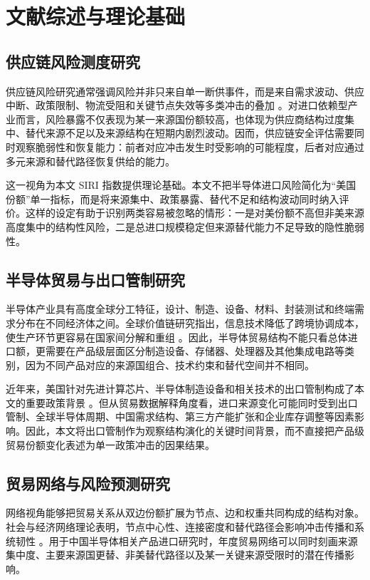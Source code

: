 \section{文献综述与理论基础}

\subsection{供应链风险测度研究}

供应链风险研究通常强调风险并非只来自单一断供事件，而是来自需求波动、供应中断、政策限制、物流受阻和关键节点失效等多类冲击的叠加 \citep{chopra2004managing,juttner2005supply}。对进口依赖型产业而言，风险暴露不仅表现为某一来源国份额较高，也体现为供应商结构过度集中、替代来源不足以及来源结构在短期内剧烈波动。因而，供应链安全评估需要同时观察脆弱性和恢复能力：前者对应冲击发生时受影响的可能程度，后者对应通过多元来源和替代路径恢复供给的能力。

这一视角为本文 SIRI 指数提供理论基础。本文不把半导体进口风险简化为“美国份额”单一指标，而是将来源集中、政策暴露、替代不足和结构波动同时纳入评价。这样的设定有助于识别两类容易被忽略的情形：一是对美份额不高但非美来源高度集中的结构性风险，二是总进口规模稳定但来源替代能力不足导致的隐性脆弱性。

\subsection{半导体贸易与出口管制研究}

半导体产业具有高度全球分工特征，设计、制造、设备、材料、封装测试和终端需求分布在不同经济体之间。全球价值链研究指出，信息技术降低了跨境协调成本，使生产环节更容易在国家间分解和重组 \citep{baldwin2016great}。因此，半导体贸易结构不能只看总体进口额，更需要在产品级层面区分制造设备、存储器、处理器及其他集成电路等类别，因为不同产品对应的来源国组合、技术约束和替代空间并不相同。

近年来，美国针对先进计算芯片、半导体制造设备和相关技术的出口管制构成了本文的重要政策背景 \citep{us_bis_controls}。但从贸易数据解释角度看，进口来源变化可能同时受到出口管制、全球半导体周期、中国需求结构、第三方产能扩张和企业库存调整等因素影响。因此，本文将出口管制作为观察结构演化的关键时间背景，而不直接把产品级贸易份额变化表述为单一政策冲击的因果结果。

\subsection{贸易网络与风险预测研究}

网络视角能够把贸易关系从双边份额扩展为节点、边和权重共同构成的结构对象。社会与经济网络理论表明，节点中心性、连接密度和替代路径会影响冲击传播和系统韧性 \citep{jackson2010social}。用于中国半导体相关产品进口研究时，年度贸易网络可以同时刻画来源集中度、主要来源国更替、非美替代路径以及某一关键来源受限时的潜在传播影响。

